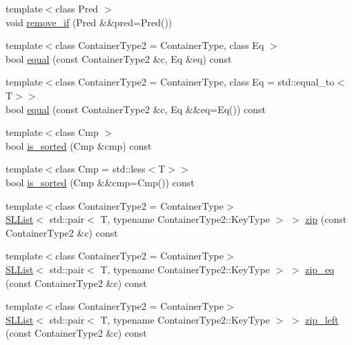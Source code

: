 \begin{DoxyCompactItemize}
\item 
{\footnotesize template$<$class Pred $>$ }\\void \hyperlink{class_designar_1_1_container_algorithms_ae619268160dffda758b816a0db9bd8a0}{remove\+\_\+if} (Pred \&\&pred=Pred())
\item 
{\footnotesize template$<$class Container\+Type2  = Container\+Type, class Eq $>$ }\\bool \hyperlink{class_designar_1_1_container_algorithms_a022bd7f2c5bd929e44b3e62020336b5c}{equal} (const Container\+Type2 \&c, Eq \&eq) const
\item 
{\footnotesize template$<$class Container\+Type2  = Container\+Type, class Eq  = std\+::equal\+\_\+to$<$\+T$>$$>$ }\\bool \hyperlink{class_designar_1_1_container_algorithms_aece8141a994780c15205aa76d306219b}{equal} (const Container\+Type2 \&c, Eq \&\&eq=Eq()) const
\item 
{\footnotesize template$<$class Cmp $>$ }\\bool \hyperlink{class_designar_1_1_container_algorithms_a7cbb0be554a1f4bad257b2d171be9bec}{is\+\_\+sorted} (Cmp \&cmp) const
\item 
{\footnotesize template$<$class Cmp  = std\+::less$<$\+T$>$$>$ }\\bool \hyperlink{class_designar_1_1_container_algorithms_ae0960afa05917d880b2d7e0f61620f9d}{is\+\_\+sorted} (Cmp \&\&cmp=Cmp()) const
\item 
{\footnotesize template$<$class Container\+Type2  = Container\+Type$>$ }\\\hyperlink{class_designar_1_1_s_l_list}{S\+L\+List}$<$ std\+::pair$<$ T, typename Container\+Type2\+::\+Key\+Type $>$ $>$ \hyperlink{class_designar_1_1_container_algorithms_ae8f296c082fa5e4c2d93a7328414d8f8}{zip} (const Container\+Type2 \&c) const
\item 
{\footnotesize template$<$class Container\+Type2  = Container\+Type$>$ }\\\hyperlink{class_designar_1_1_s_l_list}{S\+L\+List}$<$ std\+::pair$<$ T, typename Container\+Type2\+::\+Key\+Type $>$ $>$ \hyperlink{class_designar_1_1_container_algorithms_a95ada3b5554b754e331c2e6e9a742622}{zip\+\_\+eq} (const Container\+Type2 \&c) const
\item 
{\footnotesize template$<$class Container\+Type2  = Container\+Type$>$ }\\\hyperlink{class_designar_1_1_s_l_list}{S\+L\+List}$<$ std\+::pair$<$ T, typename Container\+Type2\+::\+Key\+Type $>$ $>$ \hyperlink{class_designar_1_1_container_algorithms_adc7bedc6d5b7e9df24cf590ec5e5c5c2}{zip\+\_\+left} (const Container\+Type2 \&c) const

\end{DoxyCompactItemize}
